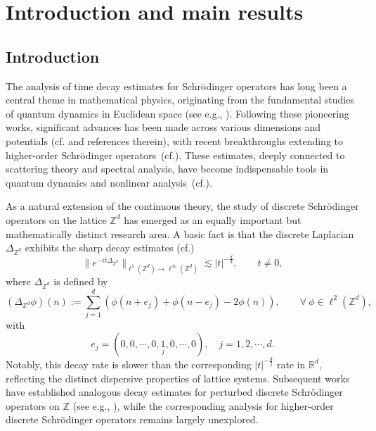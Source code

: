 \documentclass[reqno, 11pt]{amsart}
\newcommand\R{\mathbb{R}}
\newcommand\Z{\mathbb{Z}}
\numberwithin{equation}{section}
\begin{document}
\tableofcontents

\section{Introduction and main results}
\subsection{Introduction}
The analysis of time decay estimates for Schr\"{o}dinger operators has long been a central theme in mathematical physics, originating from the fundamental studies of quantum dynamics in Euclidean space (see e.g., \cite{JK79,JSS91}). Following these pioneering works, significant advances has been made across various dimensions and potentials (cf. \cite{ES04,GG15,GG17,RS04} and references therein), with recent breakthroughs extending to higher-order Schr\"{o}dinger operators~(cf.\cite{FSY18,FSWY20,EGT21,CHHZ24a,CHHZ24b}). These estimates, deeply connected to scattering theory and spectral analysis, have become indispensable tools in quantum dynamics and nonlinear analysis~(cf.\cite{Tao06, Sch07, RS78,Mar06}).

As a natural extension of the continuous theory, the study of discrete Schr\"{o}dinger operators on the lattice $\Z^d$ has emerged as an equally important but mathematically distinct research area. A basic fact is that the discrete Laplacian $\Delta_{\Z^d}$ exhibits the sharp decay estimates (cf.\cite{SK05})
\begin{equation}\label{decay est for LaplaceZd}
\big\|e^{-it\Delta_{\Z^d}}\big\|_{\ell^1(\Z^d)\rightarrow\ell^{\infty}(\Z^d)}\lesssim |t|^{-\frac{d}{3}},\qquad t\neq0,
\end{equation}
where $\Delta_{\Z^d}$ is defined by
\begin{equation}\label{definition of Laplacian}
(\Delta_{\Z^d}\phi)(n):=\sum_{j=1}^d(\phi(n+e_j)+\phi(n-e_j)-2\phi(n)), \qquad\forall\ \phi\in\ell^2(\Z^d),
\end{equation}
with $$e_j=(0,0,\cdots,0,\underset{j}{1},0,\cdots,0),\quad j=1,2,\cdots,d.$$ Notably, this decay rate is slower than the corresponding $|t|^{-\frac{d}{2}}$ rate in $\R^d$, reflecting the distinct dispersive properties of lattice systems. Subsequent works have established analogous decay estimates for perturbed discrete Schr\"{o}dinger operators on $\Z$ (see e.g., \cite{PS08,CT09,EKT15,MZ22}), while the corresponding analysis for higher-order discrete Schr\"{o}dinger operators remains largely unexplored.
\end{document}
